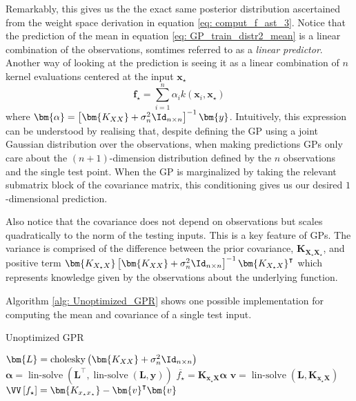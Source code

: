 Remarkably, this gives us the the exact same posterior distribution ascertained from the weight space derivation in equation \ref{eq: comput_f_ast_3}. Notice that the prediction of the mean in equation \ref{eq: GP_train_distr2_mean} is a linear combination of the observations, somtimes referred to as a {\it linear predictor}. Another way of looking at the prediction is seeing it as a linear combination of $n$ kernel evaluations centered at the input $\bm{x}_{\star}$
\[
    \bm{f}_{\star} = \sum_{i=1}^{n} \alpha_i k \left( \bm{x}_i , \bm{x}_{\star} \right)
\]
where $\bm{\alpha} = \left[ \bm{K_{XX}} + \sigma_n^2 \Id_{n \times n} \right]^{-1} \bm{y}$. Intuitively, this expression can be understood by realising that, despite defining the GP using a joint Gaussian distribution over the observations, when making predictions GPs only care about the $(n+1)$-dimension distribution defined by the $n$ observations and the single test point. When the GP is marginalized by taking the relevant submatrix block of the covariance matrix, this conditioning gives us our desired $1$-dimensional prediction.

Also notice that the covariance does not depend on observations but scales quadratically to the norm of the testing inputs. This is a key feature of GPs. The variance is comprised of the difference between the prior covariance, $\bm{K_{X_{\star}X_{\star}}}$, and positive term $\bm{K_{X_{\star}X}} \left[ \bm{K_{XX}} + \sigma_n^2 \Id_{n \times n} \right]^{-1} \bm{K_{X_{\star}X}}^{\intercal}$ which represents knowledge given by the observations about the underlying function.

Algorithm \ref{alg: Unoptimized_GPR} shows one possible implementation for computing the mean and covariance of a single test input.

    {\centering
        \begin{minipage}{.85\linewidth}
            \begin{algorithm}[H]
                \caption{Unoptimized GPR}
                \label{alg: Unoptimized_GPR}
                \SetAlgoLined
                \DontPrintSemicolon

                \BlankLine
                $\bm{L} = \operatorname{cholesky} \left( \bm{K_{XX}} + \sigma_n^2 \Id_{n \times n} \right)$\;
                $\bm{\alpha} = \operatorname{lin-solve} \left( \bm{L}^{\intercal} , \operatorname{lin-solve} \left( \bm{L}, \bm{y} \right) \right)$\;
                $\overline{f_{\star}} = \bm{K_{x_{\star} X}} \bm{\alpha}$\;
                $\bm{v} = \operatorname{lin-solve} \left( \bm{L}, \bm{K_{x_{\star} X}} \right)$\;
                $\VV \left[ f_{\star} \right] = \bm{K_{x_{\star} x_{\star}}} - \bm{v}^{\intercal} \bm{v}$\;
                \BlankLine
            \end{algorithm}
        \end{minipage}
        \par
    }

